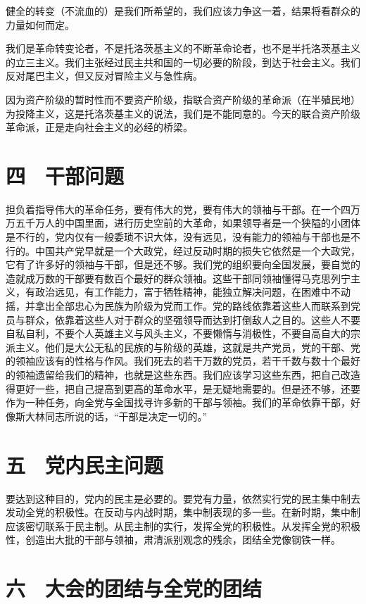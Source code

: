 健全的转变（不流血的）是我们所希望的，我们应该力争这一着，结果将看群众的力量如何而定。

我们是革命转变论者，不是托洛茨基主义的不断革命论者，也不是半托洛茨基主义的立三主义。我们主张经过民主共和国的一切必要的阶段，到达于社会主义。我们反对尾巴主义，但又反对冒险主义与急性病。

因为资产阶级的暂时性而不要资产阶级，指联合资产阶级的革命派（在半殖民地）为投降主义，这是托洛茨基主义的说法，我们是不能同意的。今天的联合资产阶级革命派，正是走向社会主义的必经的桥梁。

\section{四　干部问题}

担负着指导伟大的革命任务，要有伟大的党，要有伟大的领袖与干部。在一个四万万五千万人的中国里面，进行历史空前的大革命，如果领导者是一个狭隘的小团体是不行的，党内仅有一般委琐不识大体，没有远见，没有能力的领袖与干部也是不行的。中国共产党早就是一个大政党，经过反动时期的损失它依然是一个大政党，它有了许多好的领袖与干部，但是还不够。我们党的组织要向全国发展，要自觉的造就成万数的干部要有数百个最好的群众领袖。这些干部同领袖懂得马克思列宁主义，有政治远见，有工作能力，富于牺牲精神，能独立解决问题，在困难中不动摇，并拿出全部忠心为民族为阶级为党而工作。党的路线依靠着这些人而联系到党员与群众，依靠着这些人对于群众的坚强领导而达到打倒敌人之目的。这些人不要自私自利，不要个人英雄主义与风头主义，不要懒惰与消极性，不要自高自大的宗派主义。他们是大公无私的民族的与阶级的英雄，这就是共产党员，党的干部、党的领袖应该有的性格与作风。我们死去的若干万数的党员，若干千数与数十个最好的领袖遗留给我们的精神，也就是这些东西。我们应该学习这些东西，把自己改造得更好一些，把自己提高到更高的革命水平，是无疑地需要的。但是还不够，还要作为一种任务，向全党与全国找寻许多新的干部与领袖。我们的革命依靠干部，好像斯大林同志所说的话，“干部是决定一切的。”

\section{五　党内民主问题}

要达到这种目的，党内的民主是必要的。要党有力量，依然实行党的民主集中制去发动全党的积极性。在反动与内战时期，集中制表现的多一些。在新时期，集中制应该密切联系于民主制。从民主制的实行，发挥全党的积极性。从发挥全党的积极性，创造出大批的干部与领袖，肃清派别观念的残余，团结全党像钢铁一样。

\section{六　大会的团结与全党的团结}

